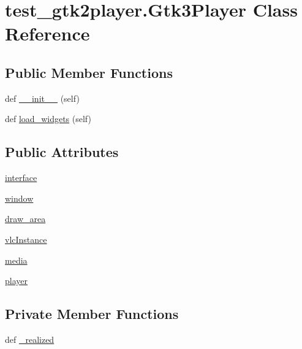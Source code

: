 \hypertarget{classtest__gtk2player_1_1Gtk3Player}{}\section{test\+\_\+gtk2player.\+Gtk3\+Player Class Reference}
\label{classtest__gtk2player_1_1Gtk3Player}
\subsection*{Public Member Functions}
\begin{DoxyCompactItemize}
\item 
def \hyperlink{classtest__gtk2player_1_1Gtk3Player_a7a6fa4e97bf64fe33e037da5cc736fd3}{\+\_\+\+\_\+init\+\_\+\+\_\+} (self)
\item 
def \hyperlink{classtest__gtk2player_1_1Gtk3Player_a1d6e04116fb0ed32dca48a6b7c9a63a6}{load\+\_\+widgets} (self)
\end{DoxyCompactItemize}
\subsection*{Public Attributes}
\begin{DoxyCompactItemize}
\item 
\hyperlink{classtest__gtk2player_1_1Gtk3Player_aa97785ac8396bfb969c59de0901f6d4a}{interface}
\item 
\hyperlink{classtest__gtk2player_1_1Gtk3Player_a3f48215e560950eee357a3649cfd1ed0}{window}
\item 
\hyperlink{classtest__gtk2player_1_1Gtk3Player_a75f7faa2eacc96250b83ecb4f43dba09}{draw\+\_\+area}
\item 
\hyperlink{classtest__gtk2player_1_1Gtk3Player_a51e16b4212f5b3b4f3d69ab29b0184f4}{vlc\+Instance}
\item 
\hyperlink{classtest__gtk2player_1_1Gtk3Player_a16b8f449385a24b5e88d3f563ff27b13}{media}
\item 
\hyperlink{classtest__gtk2player_1_1Gtk3Player_a8b60cad6d83a556f9e11a8f34fb71438}{player}
\end{DoxyCompactItemize}
\subsection*{Private Member Functions}
\begin{DoxyCompactItemize}
\item 
def \hyperlink{classtest__gtk2player_1_1Gtk3Player_a5318f214cc4c8a6146c1af8dc22f1db6}{\+\_\+realized}
\end{DoxyCompactItemize}


